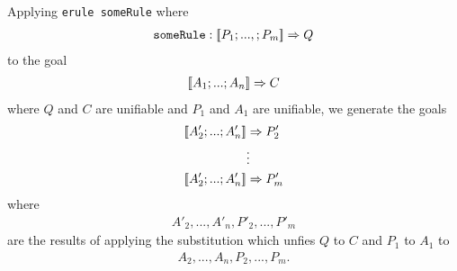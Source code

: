 \documentclass{article}
\begin{document}
\begin{definition}
	Applying \texttt{erule someRule} where
	\begin{align*}
		\texttt{someRule} : [\![P_1;...,;P_m]\!] \Rightarrow Q
	\end{align*}
	to the goal
	\begin{align*}
		[\![A_1; ...; A_n]\!] \Rightarrow C
	\end{align*}
	where $Q$ and $C$ are unifiable and $P_1$ and $A_1$ are unifiable, we generate the goals
	\begin{align*}
		\db{A'_2; ...; A'_n} & \Rightarrow P'_2 \\
		                     & \vdots           \\
		\db{A'_2; ...; A'_n} & \Rightarrow P'_m
	\end{align*}
	where \begin{align*}
		A'_2, ..., A'_n,P'_2,...,P'_m
	\end{align*}
	are the results of applying the
	substitution which unfies $Q$ to $C$ and $P_1$ to $A_1$ to
	\begin{align*}
		A_2,...,A_n,P_2,...,P_m.
	\end{align*}
\end{definition}
\end{document}

